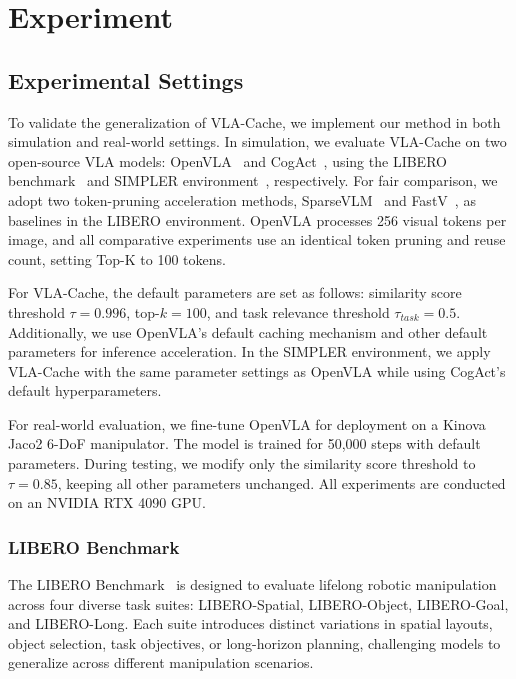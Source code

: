 
\section{Experiment}
\label{sec:experiments}

\subsection{Experimental Settings}
To validate the generalization of VLA-Cache, we implement our method in both simulation and real-world settings. In simulation, we evaluate VLA-Cache on two open-source VLA models: OpenVLA~\cite{kim24openvla} and CogAct~\cite{li2024cogact}, using the LIBERO benchmark~\cite{liu2024libero} and SIMPLER environment~\cite{li2024evaluating}, respectively. For fair comparison, we adopt two token-pruning acceleration methods, SparseVLM~\cite{zhang2024sparsevlm} and FastV~\cite{chen2025image}, as baselines in the LIBERO environment. OpenVLA processes 256 visual tokens per image, and all comparative experiments use an identical token pruning and reuse count, setting Top-K to 100 tokens.

For VLA-Cache, the default parameters are set as follows: similarity score threshold $\tau=0.996$, top-$k = 100$, and task relevance threshold $\tau_{task}=0.5$. Additionally, we use OpenVLA’s default caching mechanism and other default parameters for inference acceleration. In the SIMPLER environment, we apply VLA-Cache with the same parameter settings as OpenVLA while using CogAct’s default hyperparameters.

For real-world evaluation, we fine-tune OpenVLA for deployment on a Kinova Jaco2 6-DoF manipulator. The model is trained for 50,000 steps with default parameters. During testing, we modify only the similarity score threshold to $\tau=0.85$, keeping all other parameters unchanged. All experiments are conducted on an NVIDIA RTX 4090 GPU.

\subsubsection{LIBERO Benchmark}
The LIBERO Benchmark~\cite{liu2024libero} is designed to evaluate lifelong robotic manipulation across four diverse task suites: LIBERO-Spatial, LIBERO-Object, LIBERO-Goal, and LIBERO-Long. Each suite introduces distinct variations in spatial layouts, object selection, task objectives, or long-horizon planning, challenging models to generalize across different manipulation scenarios.

